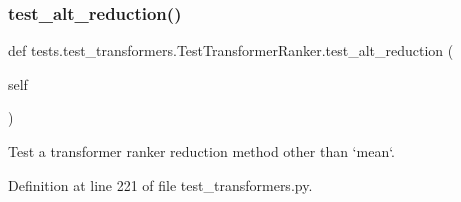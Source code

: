 \subsubsection{\texorpdfstring{test\+\_\+alt\+\_\+reduction()}{test\_alt\_reduction()}}
{\footnotesize\ttfamily def tests.\+test\+\_\+transformers.\+Test\+Transformer\+Ranker.\+test\+\_\+alt\+\_\+reduction (\begin{DoxyParamCaption}\item[{}]{self }\end{DoxyParamCaption})}

\begin{DoxyVerb}Test a transformer ranker reduction method other than `mean`.
\end{DoxyVerb}
 

Definition at line 221 of file test\+\_\+transformers.\+py.


